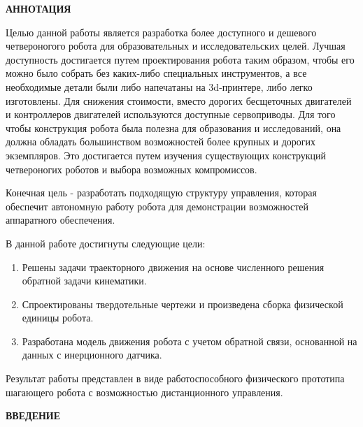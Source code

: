 
\newpage
\begin{center}
	\textbf{АННОТАЦИЯ}
\end{center}

Целью данной работы является разработка более доступного и дешевого четвероногого робота для образовательных и исследовательских целей. Лучшая доступность достигается путем проектирования робота таким образом, чтобы его можно было собрать без каких-либо специальных инструментов, а все необходимые детали были либо напечатаны на 3d-принтере, либо легко изготовлены. Для снижения стоимости, вместо дорогих бесщеточных двигателей и контроллеров двигателей используются доступные сервоприводы. Для того чтобы конструкция робота была полезна для образования и исследований, она должна обладать большинством возможностей более крупных и дорогих экземпляров. Это достигается путем изучения существующих конструкций четвероногих роботов и выбора возможных компромиссов.

Конечная цель - разработать подходящую структуру управления, которая обеспечит автономную работу робота для демонстрации возможностей аппаратного обеспечения.

В данной работе достигнуты следующие цели:
\begin{enumerate} 
	\item Решены задачи траекторного движения на основе численного решения обратной задачи кинематики.
	\item Спроектированы твердотельные чертежи и произведена сборка физической единицы робота.
	\item Разработана модель движения робота с учетом обратной связи, основанной на данных с инерционного датчика.
\end{enumerate}
Результат работы представлен в виде работоспособного физического прототипа шагающего робота с возможностью дистанционного управления.


\onehalfspacing
\setcounter{page}{2}
\renewcommand{\contentsname}{\centerline{\Large{Cодержание}}}
\tableofcontents
{}
\renewcommand{\contentsname}{\centerline{\Large{Cодержание}}}

\newpage
\begin{center}
	\textbf{ВВЕДЕНИЕ}
\end{center}

